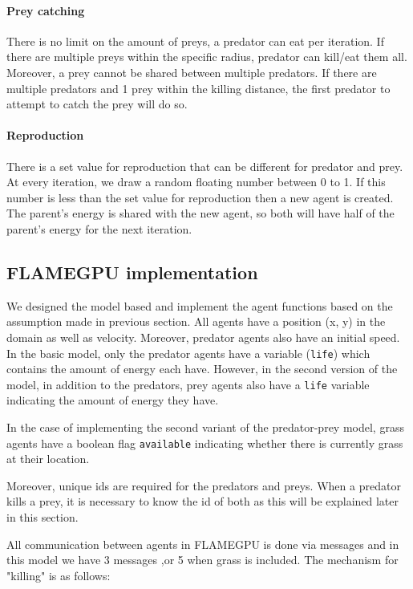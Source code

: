 \paragraph{Prey catching}
There is no limit on the amount of preys, a predator can eat per iteration. If there are multiple preys within the specific radius, predator can kill/eat them all. Moreover, a prey cannot be shared between multiple predators. If there are multiple predators and 1 prey within the killing distance, the first predator to attempt to catch the prey will do so.

\paragraph{Reproduction}
There is a set value for reproduction that can be different for predator and prey. At every iteration, we draw a random floating number between 0 to 1. If this number is less than the set value for reproduction then a new agent is created. The parent’s energy is shared with the new agent, so both will have half of the parent’s energy for the next iteration.

\subsection{FLAMEGPU implementation}\label{sec:implementation}
We designed the model based and implement the agent functions based on the assumption made in previous section. All agents have a position (x, y) in the domain as well as velocity. Moreover, predator agents also have an initial speed. In the basic model, only the predator agents have a variable (\verb|life|) which contains the amount of energy each have. However, in the second version of the model, in addition to the predators, prey agents also have a \verb|life| variable indicating the amount of energy they have.

In the case of implementing the second variant of the predator-prey model, grass agents have a boolean flag \verb|available| indicating whether there is currently grass at their location.

Moreover, unique ids are required for the predators and preys. When a predator kills a prey, it is necessary to know the id of both as this will be explained later in this section.

All communication between agents in FLAMEGPU is done via messages and in this model we have 3 messages ,or 5 when grass is included. The mechanism for "killing" is as follows:

